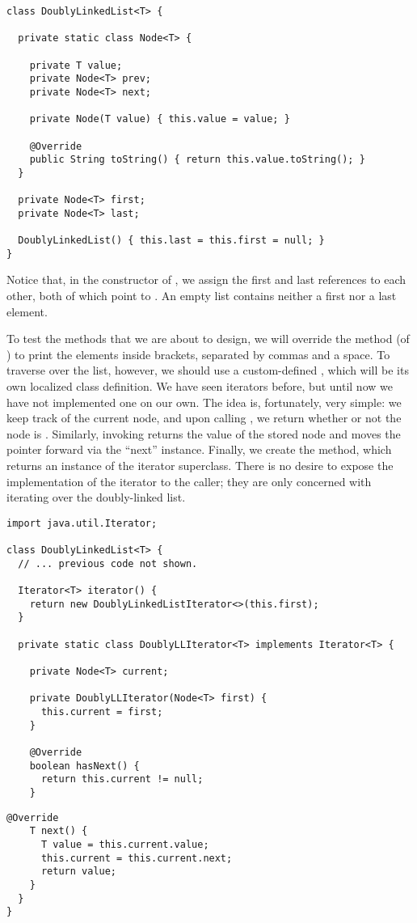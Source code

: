 \newpage
\begin{lstlisting}[language=MyJava]
class DoublyLinkedList<T> {

  private static class Node<T> {

    private T value;
    private Node<T> prev;
    private Node<T> next;

    private Node(T value) { this.value = value; }

    @Override
    public String toString() { return this.value.toString(); }
  }

  private Node<T> first;
  private Node<T> last;

  DoublyLinkedList() { this.last = this.first = null; }
}
\end{lstlisting}

Notice that, in the constructor of , we assign the first and last references to each other, both of which point to . 
An empty list contains neither a first nor a last element.

To test the methods that we are about to design, we will override the  method (of ) to print the elements inside brackets, separated by commas and a space. To traverse over the list, however, we should use a custom-defined , which will be its own localized class definition. We have seen iterators before, but until now we have not implemented one on our own. The idea is, fortunately, very simple: we keep track of the current node, and upon calling , we return whether or not the node is . Similarly, invoking  returns the value of the stored node and moves the pointer forward via the ``next'' instance. Finally, we create the  method, which returns an instance of the iterator superclass. There is no desire to expose the implementation of the iterator to the caller; they are only concerned with iterating over the doubly-linked list.

\begin{lstlisting}[language=MyJava]
import java.util.Iterator;

class DoublyLinkedList<T> {
  // ... previous code not shown.

  Iterator<T> iterator() {
    return new DoublyLinkedListIterator<>(this.first);
  }

  private static class DoublyLLIterator<T> implements Iterator<T> {
    
    private Node<T> current;

    private DoublyLLIterator(Node<T> first) {
      this.current = first;
    }

    @Override
    boolean hasNext() { 
      return this.current != null; 
    }
\end{lstlisting}
\newpage
\begin{lstlisting}[language=MyJava]
    @Override
    T next() {
      T value = this.current.value;
      this.current = this.current.next;
      return value;
    }
  }
}
\end{lstlisting}

